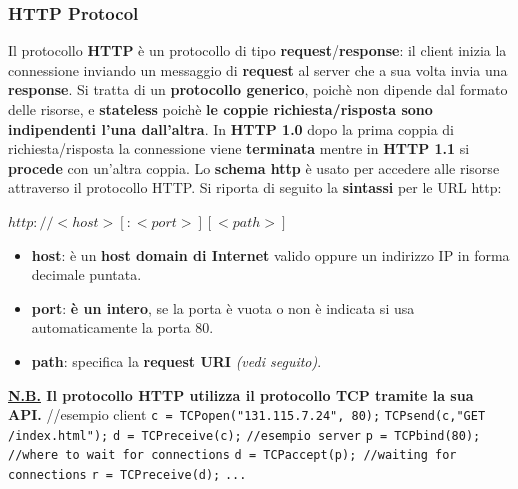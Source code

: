 \documentclass[11pt,a4paper]{article}
\theoremstyle{definition}
\begin{document}
\subsubsection{HTTP Protocol}
Il protocollo \textbf{HTTP} è un protocollo di tipo \textbf{request}/\textbf{response}: il client inizia la connessione inviando un messaggio di \textbf{request} al server che a sua volta invia una \textbf{response}. Si tratta di un \textbf{protocollo generico}, poichè non dipende dal formato delle risorse, e \textbf{stateless} poichè \textbf{le coppie richiesta/risposta sono indipendenti l'una dall'altra}. In \textbf{HTTP 1.0} dopo la prima coppia di richiesta/risposta la connessione viene \textbf{terminata} mentre in \textbf{HTTP 1.1} si \textbf{procede} con un’altra coppia. \newline
Lo \textbf{schema http} è usato per accedere alle risorse attraverso il protocollo HTTP. \newpage
Si riporta di seguito la \textbf{sintassi} per le URL http:\newline\newline
\centerline{\LARGE$http: // <host> [ : <port> ] [ <path> ]$}
\begin{itemize}
	\item \textbf{host}: è un \textbf{host domain di Internet} valido oppure un indirizzo IP in forma decimale puntata.
	\item \textbf{port}: \textbf{è un intero}, se  la porta è vuota o non è indicata si usa automaticamente la porta 80.
	\item \textbf{path}: specifica la \textbf{request URI} \textit{(vedi seguito)}.
\end{itemize}
\textbf{\underline{N.B.} Il protocollo HTTP utilizza il protocollo TCP tramite la sua API.}\newline\newline
//esempio client\newline
\texttt{c = TCPopen("131.115.7.24", 80);}\newline
\texttt{TCPsend(c,"GET /index.html");}\newline
\texttt{d = TCPreceive(c);}\newline\newline
\texttt{//esempio server}\newline
\texttt{p = TCPbind(80); //where to wait for connections}\newline
\texttt{d = TCPaccept(p); //waiting for connections}\newline
\texttt{r = TCPreceive(d);}\newline
\texttt{...}\newline
\end{document}
